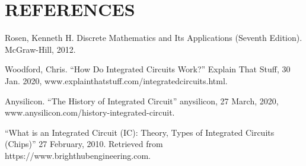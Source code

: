 \documentclass[letterpaper, 10 pt, conference]{IEEEconf}
\begin{document}
\section*{REFERENCES}


\begin{enumerate}[label={[\arabic*]}]
\item Rosen, Kenneth  H. Discrete Mathematics and Its Applications (Seventh Edition). McGraw-Hill, 2012. 
\item Woodford, Chris. “How Do Integrated Circuits Work?” Explain That Stuff, 30 Jan. 2020, www.explainthatstuff.com/integratedcircuits.html. 
\item Anysilicon. “The History of Integrated Circuit” anysilicon, 27 March, 2020, www.anysilicon.com/history-integrated-circuit.
\item “What is an Integrated Circuit (IC): Theory, Types of Integrated Circuits (Chips)” 27 February, 2010. Retrieved from https://www.brighthubengineering.com.


\end{enumerate}
\end{document}
